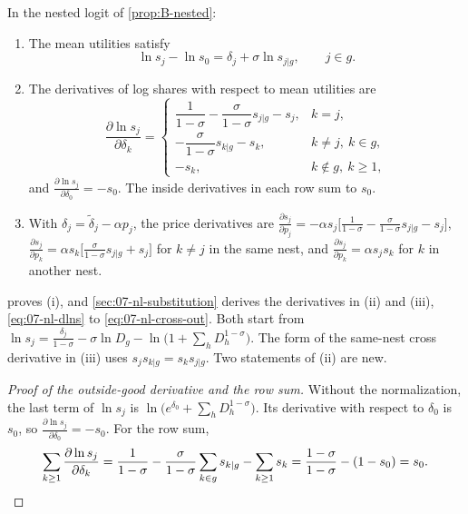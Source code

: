 \begin{proposition}\label{prop:B-nested-inversion}
In the nested logit of \cref{prop:B-nested}:
\begin{enumerate}[label=(\roman*)]
\item The mean utilities satisfy
  \begin{equation}\label{eq:B-nl-inversion}
  \ln s_j - \ln s_0 = \delta_j + \sigma\ln s_{j|g}, \qquad j \in g .
  \end{equation}
\item The derivatives of log shares with respect to mean utilities are
  \begin{equation}\label{eq:B-nl-logderiv}
  \frac{\partial\ln s_j}{\partial\delta_k} =
  \begin{cases}
  \dfrac{1}{1 - \sigma} - \dfrac{\sigma}{1 - \sigma}s_{j|g} - s_j, & k = j,\\[8pt]
  -\dfrac{\sigma}{1 - \sigma}s_{k|g} - s_k, & k \neq j,\ k \in g,\\[8pt]
  -s_k, & k \notin g,\ k \geq 1,
  \end{cases}
  \end{equation}
  and $\frac{\partial\ln s_j}{\partial\delta_0} = -s_0$. The inside derivatives in each row sum to $s_0$.
\item With $\delta_j = \tilde\delta_j - \alpha p_j$, the price derivatives are
  $\frac{\partial s_j}{\partial p_j} = -\alpha s_j\big[\frac{1}{1 - \sigma} - \frac{\sigma}{1 - \sigma}s_{j|g} - s_j\big]$,
  $\frac{\partial s_j}{\partial p_k} = \alpha s_k\big[\frac{\sigma}{1 - \sigma}s_{j|g} + s_j\big]$ for $k \neq j$ in the same nest, and
  $\frac{\partial s_j}{\partial p_k} = \alpha s_js_k$ for $k$ in another nest.
\end{enumerate}
\end{proposition}

 proves (i), and \cref{sec:07-nl-substitution} derives the derivatives in (ii) and
(iii), \eqref{eq:07-nl-dlns} to \eqref{eq:07-nl-cross-out}. Both start from
$\ln s_j = \frac{\delta_j}{1 - \sigma} - \sigma\ln D_g - \ln\big(1 + \sum_hD_h^{1 - \sigma}\big)$. The form of the
same-nest cross derivative in (iii) uses $s_js_{k|g} = s_ks_{j|g}$. Two statements of (ii) are new.

\begin{proof}[Proof of the outside-good derivative and the row sum]
Without the normalization, the last term of $\ln s_j$ is $\ln\big(e^{\delta_0} + \sum_hD_h^{1 - \sigma}\big)$. Its
derivative with respect to $\delta_0$ is $s_0$, so $\frac{\partial\ln s_j}{\partial\delta_0} = -s_0$. For the row sum,
\begin{equation*}
\sum_{k \geq 1}\frac{\partial\ln s_j}{\partial\delta_k}
= \frac{1}{1 - \sigma} - \frac{\sigma}{1 - \sigma}\sum_{k \in g}s_{k|g} - \sum_{k \geq 1}s_k
= \frac{1 - \sigma}{1 - \sigma} - (1 - s_0) = s_0 . \qedhere
\end{equation*}
\end{proof}

